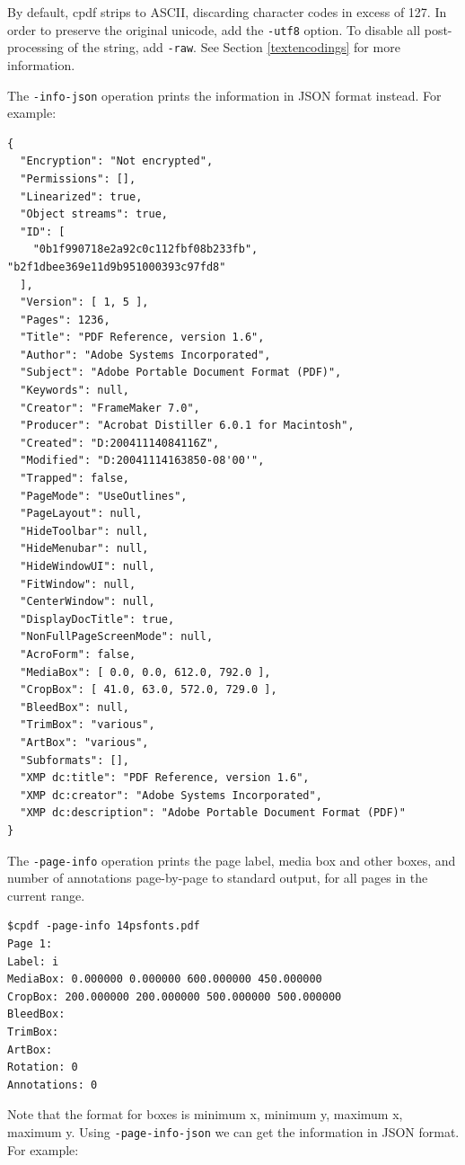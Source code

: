 \documentclass{book}
\begin{document}
By default, cpdf strips to ASCII, discarding character codes in excess of 127. In order to preserve the original unicode, add the \texttt{-utf8} option. To disable all post-processing of the string, add \texttt{-raw}. See Section \ref{textencodings} for more information.

The \texttt{-info-json} operation prints the information in JSON format instead. For example:

\begin{framed}
{\small\begin{verbatim}
{
  "Encryption": "Not encrypted",
  "Permissions": [],
  "Linearized": true,
  "Object streams": true,
  "ID": [
    "0b1f990718e2a92c0c112fbf08b233fb", "b2f1dbee369e11d9b951000393c97fd8"
  ],
  "Version": [ 1, 5 ],
  "Pages": 1236,
  "Title": "PDF Reference, version 1.6",
  "Author": "Adobe Systems Incorporated",
  "Subject": "Adobe Portable Document Format (PDF)",
  "Keywords": null,
  "Creator": "FrameMaker 7.0",
  "Producer": "Acrobat Distiller 6.0.1 for Macintosh",
  "Created": "D:20041114084116Z",
  "Modified": "D:20041114163850-08'00'",
  "Trapped": false,
  "PageMode": "UseOutlines",
  "PageLayout": null,
  "HideToolbar": null,
  "HideMenubar": null,
  "HideWindowUI": null,
  "FitWindow": null,
  "CenterWindow": null,
  "DisplayDocTitle": true,
  "NonFullPageScreenMode": null,
  "AcroForm": false,
  "MediaBox": [ 0.0, 0.0, 612.0, 792.0 ],
  "CropBox": [ 41.0, 63.0, 572.0, 729.0 ],
  "BleedBox": null,
  "TrimBox": "various",
  "ArtBox": "various",
  "Subformats": [],
  "XMP dc:title": "PDF Reference, version 1.6",
  "XMP dc:creator": "Adobe Systems Incorporated",
  "XMP dc:description": "Adobe Portable Document Format (PDF)"
}
\end{verbatim}}\end{framed}

\noindent The \texttt{-page-info} operation prints the page label, media box and other boxes, and number of annotations page-by-page to standard output, for all pages in the current range.

\begin{framed}
{\small\begin{verbatim}
$cpdf -page-info 14psfonts.pdf
Page 1:
Label: i
MediaBox: 0.000000 0.000000 600.000000 450.000000
CropBox: 200.000000 200.000000 500.000000 500.000000
BleedBox: 
TrimBox: 
ArtBox:
Rotation: 0
Annotations: 0
\end{verbatim}}
\end{framed}

\noindent Note that the format for boxes is minimum x, minimum y, maximum x, maximum y. Using \texttt{-page-info-json} we can get the information in JSON format. For example:
\end{document}
